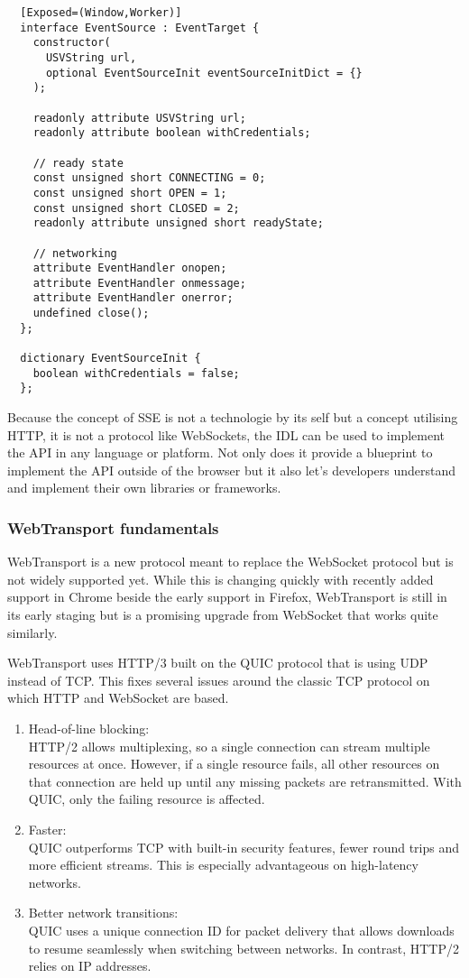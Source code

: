 \begin{verbatim}
  [Exposed=(Window,Worker)]
  interface EventSource : EventTarget {
    constructor(
      USVString url,
      optional EventSourceInit eventSourceInitDict = {}
    );
  
    readonly attribute USVString url;
    readonly attribute boolean withCredentials; 
  
    // ready state
    const unsigned short CONNECTING = 0;
    const unsigned short OPEN = 1;
    const unsigned short CLOSED = 2;
    readonly attribute unsigned short readyState;
  
    // networking
    attribute EventHandler onopen;
    attribute EventHandler onmessage;
    attribute EventHandler onerror;
    undefined close();
  };
  
  dictionary EventSourceInit { 
    boolean withCredentials = false; 
  };  
\end{verbatim}

Because the concept of SSE is not a technologie by its self but a concept utilising HTTP, it is not a protocol like WebSockets, the IDL can be used to implement the API in any language or platform. Not only does it provide a blueprint to implement the API outside of the browser but it also let's developers understand and implement their own libraries or frameworks.

\subsubsection{WebTransport fundamentals}

WebTransport is a new protocol meant to replace the WebSocket protocol but is not widely supported yet. While this is changing quickly with recently added support in Chrome beside the early support in Firefox, WebTransport is still in its early staging but is a promising upgrade from WebSocket that works quite similarly.

WebTransport uses HTTP/3 built on the QUIC protocol that is using UDP instead of TCP. This fixes several issues around the classic TCP protocol on which HTTP and WebSocket are based. \cite{w3-wt}

\begin{enumerate}
  \item Head-of-line blocking: \\ HTTP/2 allows multiplexing, so a single connection can stream multiple resources at once. However, if a single resource fails, all other resources on that connection are held up until any missing packets are retransmitted. With QUIC, only the failing resource is affected.
  \item Faster: \\ QUIC outperforms TCP with built-in security features, fewer round trips and more efficient streams. This is especially advantageous on high-latency networks.
  \item Better network transitions: \\ QUIC uses a unique connection ID for packet delivery that allows downloads to resume seamlessly when switching between networks. In contrast, HTTP/2 relies on IP addresses.
\end{enumerate}

